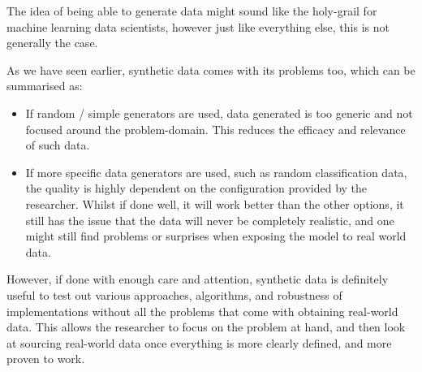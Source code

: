 The idea of being able to generate data might sound like the holy-grail for machine learning data scientists, however just like everything else, this is not generally the case.

As we have seen earlier, synthetic data comes with its problems too, which can be summarised as:

\begin{itemize}
    \item If random / simple generators are used, data generated is too generic and not focused around the problem-domain. This reduces the efficacy and relevance of such data.
    \item If more specific data generators are used, such as random classification data, the quality is highly dependent on the configuration provided by the researcher. Whilst if done well, it will work better than the other options, it still has the issue that the data will never be completely realistic, and one might still find problems or surprises when exposing the model to real world data.
\end{itemize}

However, if done with enough care and attention, synthetic data is definitely useful to test out various approaches, algorithms, and robustness of implementations without all the problems that come with obtaining real-world data. This allows the researcher to focus on the problem at hand, and then look at sourcing real-world data once everything is more clearly defined, and more proven to work.